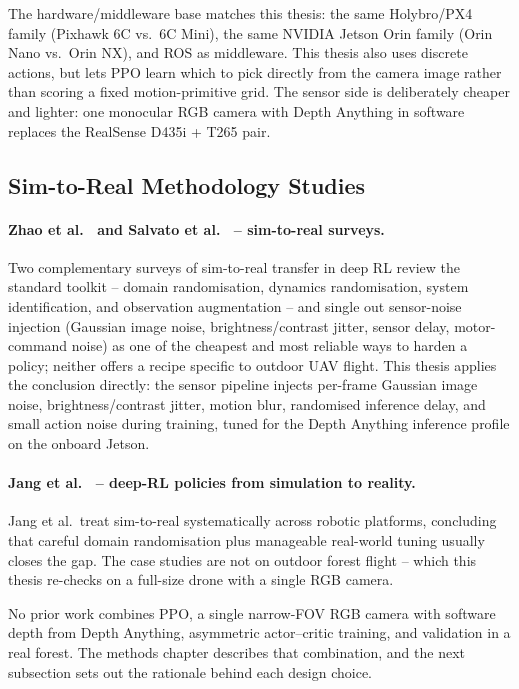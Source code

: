 \documentclass[../main.tex]{subfiles}
\begin{document}
The hardware/middleware base matches this thesis: the same Holybro/PX4 family (Pixhawk 6C vs.\ 6C Mini), the same NVIDIA Jetson Orin family (Orin Nano vs.\ Orin NX), and ROS as middleware. This thesis also uses discrete actions, but lets PPO learn which to pick directly from the camera image rather than scoring a fixed motion-primitive grid. The sensor side is deliberately cheaper and lighter: one monocular RGB camera with Depth Anything in software replaces the RealSense D435i + T265 pair.

\subsection{Sim-to-Real Methodology Studies}

\paragraph{Zhao et al.\ \cite{Zhao2020} and Salvato et al.\ \cite{Salvato2021} -- sim-to-real surveys.}
Two complementary surveys of sim-to-real transfer in deep RL review the standard toolkit -- domain randomisation, dynamics randomisation, system identification, and observation augmentation -- and single out sensor-noise injection (Gaussian image noise, brightness/contrast jitter, sensor delay, motor-command noise) as one of the cheapest and most reliable ways to harden a policy; neither offers a recipe specific to outdoor UAV flight. This thesis applies the conclusion directly: the sensor pipeline injects per-frame Gaussian image noise, brightness/contrast jitter, motion blur, randomised inference delay, and small action noise during training, tuned for the Depth Anything inference profile on the onboard Jetson.

\paragraph{Jang et al.\ \cite{Jang2024} -- deep-RL policies from simulation to reality.}
Jang et al.\ treat sim-to-real systematically across robotic platforms, concluding that careful domain randomisation plus manageable real-world tuning usually closes the gap. The case studies are not on outdoor forest flight -- which this thesis re-checks on a full-size drone with a single RGB camera.

No prior work combines PPO, a single narrow-FOV RGB camera with software depth from Depth Anything, asymmetric actor--critic training, and validation in a real forest. The methods chapter describes that combination, and the next subsection sets out the rationale behind each design choice.
\end{document}
